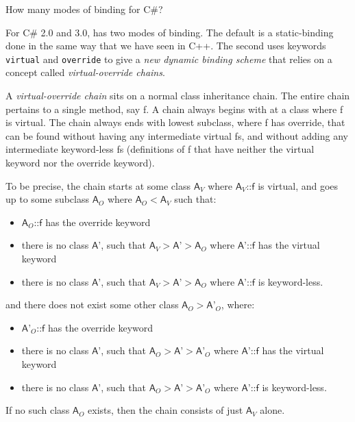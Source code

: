 \begin{example}
How many modes of binding for C\#? 

For C\# 2.0 and 3.0, has two modes of binding. 
The default is a static-binding done in the same way that we have seen in C++. 
The second uses keywords \lstinline{virtual} and \lstinline{override} 
to give a \textit{new dynamic binding scheme} that relies on a concept called 
\textit{virtual-override chains}. 

A \textit{virtual-override chain} sits on a normal class inheritance chain.
The entire chain pertains to a single method, say \textsf{f}. 
A chain always begins with at a class where \textsf{f} is virtual. 
The chain always ends with lowest subclass, where \textsf{f} has override,
that can be found without having any intermediate virtual \textsf{f}s,
and without adding any intermediate keyword-less \textsf{f}s 
(definitions of \textsf{f} that 
have neither the virtual keyword nor the override keyword).

To be precise, the chain starts at some class $\textsf{A}_V$  
where $\textsf{A}_V\textsf{::f}$ is virtual, and 
goes up to some subclass $\textsf{A}_O$ where $\textsf{A}_O < \textsf{A}_V$ such that:
\begin{itemize}[nosep]
\item $\textsf{A}_O\textsf{::f}$ has the override keyword
\item there is no class $\textsf{A'}$, such that 
$\textsf{A}_V > \textsf{A'} > \textsf{A}_O$ where $\textsf{A'::f}$ has the virtual keyword
\item there is no class $\textsf{A'}$, 
such that $\textsf{A}_V > \textsf{A'} > \textsf{A}_O$ 
where $\textsf{A'::f}$ is keyword-less. 
\end{itemize} 

and there does not exist some other class $\textsf{A}_O > \textsf{A'}_O$, where:
\begin{itemize}[nosep]
\item $\textsf{A'}_O\textsf{::f}$ has the override keyword
\item there is no class $\textsf{A'}$, such that 
$\textsf{A}_O > \textsf{A'} > \textsf{A'}_O$ where $\textsf{A'::f}$ has the virtual keyword
\item there is no class $\textsf{A'}$, 
such that $\textsf{A}_O > \textsf{A'} > \textsf{A'}_O$ 
where $\textsf{A'::f}$ is keyword-less. 
\end{itemize}

If no such class $\textsf{A}_O$ exists, then the chain consists of just $\textsf{A}_V$ alone.

\frmrule





\end{example}

